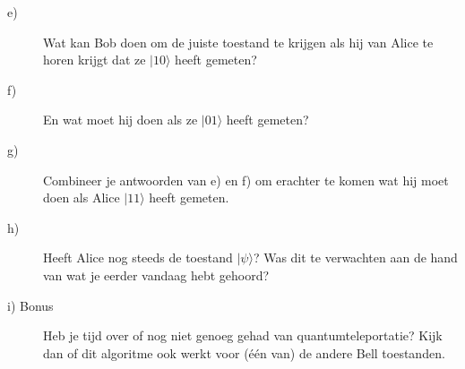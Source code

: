 \documentclass[10pt, a4paper]{article}
\begin{document}
\begin{description}
\item[e)] Wat kan Bob doen om de juiste toestand te krijgen als hij van Alice te horen krijgt dat ze $|10\rangle$ heeft gemeten?
\item[f)] En wat moet hij doen als ze $|01\rangle$ heeft gemeten?
\item[g)] Combineer je antwoorden van e) en f) om erachter te komen wat hij moet doen als Alice $|11\rangle$ heeft gemeten.
\item[h)] Heeft Alice nog steeds de toestand $|\psi\rangle$? Was dit te verwachten aan de hand van wat je eerder vandaag hebt gehoord?
\item[i) Bonus] Heb je tijd over of nog niet genoeg gehad van quantumteleportatie? Kijk dan of dit algoritme ook werkt voor (\'e\'en van) de andere Bell toestanden.
\end{description}
\end{document}
